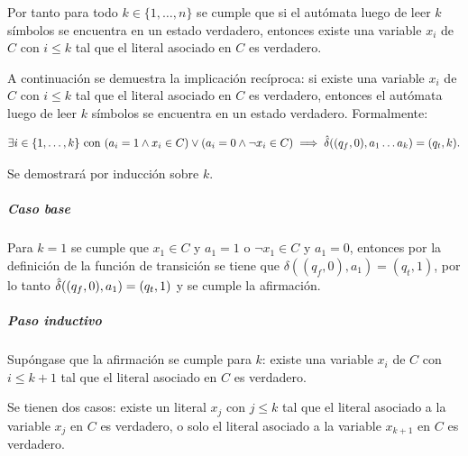 Por tanto para todo $k \in \{1, \ldots, n\}$ se cumple que si el autómata luego de leer $k$ símbolos se encuentra en un estado verdadero, entonces existe una variable $x_i$ de $C$ con $i \leq k$ tal que el literal asociado en $C$ es verdadero.

A continuación se demuestra la implicación recíproca: si existe una variable $x_i$ de $C$ con $i \leq k$ tal que el literal asociado en $C$ es verdadero, entonces el autómata luego de leer $k$ símbolos se encuentra en un estado verdadero. Formalmente:

\begin{equation}
    \label{eq:ac-implied-by}
    \exists i \in \{1, \ldots, k \} \text{ con } (a_i = 1 \land x_i \in C) \lor (a_i = 0 \land \neg x_i \in C) \implies \hat{\delta}((q_f, 0), a_1 \ldots a_k) = (q_t, k).
\end{equation}


Se demostrará por inducción sobre $k$.

\subparagraph{Caso base} Para $k = 1$ se cumple que $x_1 \in C$ y $a_1 = 1$ o $\neg x_1 \in C$ y $a_1 = 0$, entonces por la definición de la función de transición se tiene que $\delta((q_f, 0), a_1) = (q_t, 1)$, por lo tanto $\hat{\delta}((q_f, 0), a_1) = (q_t, 1)$ y se cumple la afirmación.

\subparagraph{Paso inductivo} Supóngase que la afirmación se cumple para $k$: existe una variable $x_i$ de $C$ con $i \leq k+1$ tal que el literal asociado en $C$ es verdadero.

Se tienen dos casos: existe un literal $x_j$ con $j \leq k$ tal que el literal asociado a la variable $x_j$ en $C$ es verdadero, o solo el literal asociado a la variable $x_{k+1}$ en $C$ es verdadero.

